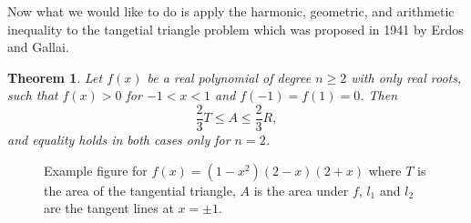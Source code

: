 \documentclass[12pt]{extreport}
\newtheorem*{thm}{Theorem}
\begin{document}
Now what we would like to do is apply the harmonic, geometric, and arithmetic inequality to the tangetial triangle problem which was proposed in 1941 by Erdos and Gallai.
\begin{thm}
Let $f(x)$ be a real polynomial of degree $n\geq 2$ with only real roots, such that $f(x)>0$ for $-1<x<1$ and $f(-1) = f(1) = 0$. Then $$\frac{2}{3}T \leq A \leq \frac{2}{3}R,$$ and equality holds in both cases only for $n = 2$.
\end{thm}
\begin{figure}[H]
\centering
{}
\caption{Example figure for $f(x) = (1 - x^2) (2 - x) (2 + x)$ where $T$ is the area of the tangential triangle, $A$ is the area under $f$, $l_1$ and $l_2$ are the tangent lines at $x = \pm 1$.}
\end{figure}
\end{document}
